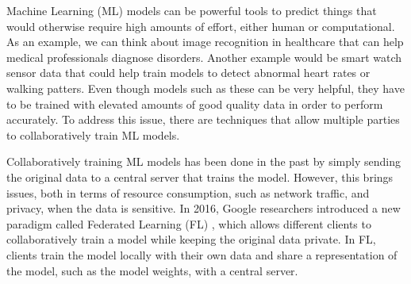 
Machine Learning (ML) models can be powerful tools to predict things that would otherwise require high amounts of effort, either human or computational. As an example, we can think about image recognition in healthcare that can help medical professionals diagnose disorders. Another example would be smart watch sensor data that could help train models to detect abnormal heart rates or walking patters. Even though models such as these can be very helpful, they have to be trained with elevated amounts of good quality data in order to perform accurately. To address this issue, there are techniques that allow multiple parties to collaboratively train ML models.



Collaboratively training ML models has been done in the past by simply sending the original data to a central server that trains the model. However, this brings issues, both in terms of resource consumption, such as network traffic, and privacy, when the data is sensitive. In 2016, Google researchers introduced a new paradigm called Federated Learning (FL) \cite{10.48550/arxiv.1602.05629}, which allows different clients to collaboratively train a model while keeping the original data private. In FL, clients train the model locally with their own data and share a representation of the model, such as the model weights, with a central server. 


